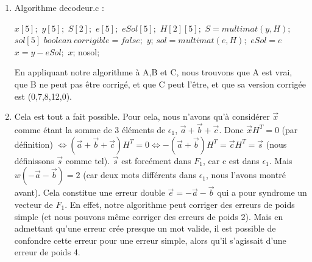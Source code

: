 \documentclass[10p,a4paper]{scrartcl}
\renewcommand{\(}{\left(}
\renewcommand{\)}{\right)}
\begin{document}
\begin{enumerate}
\begin{enumerate}
				\item	\begin{algorithm}[!h]
							\caption{Algorithme decodeur.c :}
							\begin{algorithmic}
								\State $x[5];$
								\State $y[5];$
								\State $S[2];$
								\State $e[5];$
								\State $eSol[5];$
								\State $H[2][5];$
								\State $S = multimat(y,H);$
								\State $sol[5]$
								\State $boolean\ corrigible = false;$
									\State \Return $y$;
								\Else								 
										\State $sol = multimat(e,H);$
											\State  $eSol = e$
										\EndIf 
									\EndFor
								\EndIf
									\State $x = y - eSol;$
									\State \Return $x$;
								\Else
									\State \Return nosol;
								\EndIf
							\end{algorithmic}
						\end{algorithm}
						En appliquant notre algorithme à A,B et C, nous trouvons que A est vrai, que B ne peut pas être corrigé, et que C peut l'être, et que sa version corrigée est (0,7,8,12,0).
				\item Cela est tout a fait possible. Pour cela, nous n'avons qu'à considérer $\vec{x}$ comme étant la somme de 3 éléments de $\epsilon_1$, $\vec{a}+\vec{b}+\vec{c}$. Donc $\vec{x}H^T = 0$ (par définition) $\iff (\vec{a} + \vec{b} + \vec{c})H^T = 0 \iff -(\vec{a}+\vec{b})H^T = \vec{c}H^T = \vec{s}$ (nous définissons $\vec{s}$ comme tel). $\vec{s}$ est forcément dans $\textit{F}_1$, car c est dans $\epsilon_1$. Mais $w(-\vec{a}-\vec{b}) = 2$ (car deux mots différents dans $\epsilon_1$, nous l'avons montré avant). Cela constitue une erreur double $\vec{e} = -\vec{a}-\vec{b}$ qui a pour syndrome un vecteur de $\textit{F}_1$. En effet, notre algorithme peut corriger des erreurs de poids simple (et nous pouvons même corriger des erreurs de poids 2). Mais en admettant qu'une erreur crée presque un mot valide, il est possible de confondre cette erreur pour une erreur simple, alors qu'il s'agissait d'une erreur de poids 4.
			\end{enumerate}
\end{enumerate}
\end{document}
